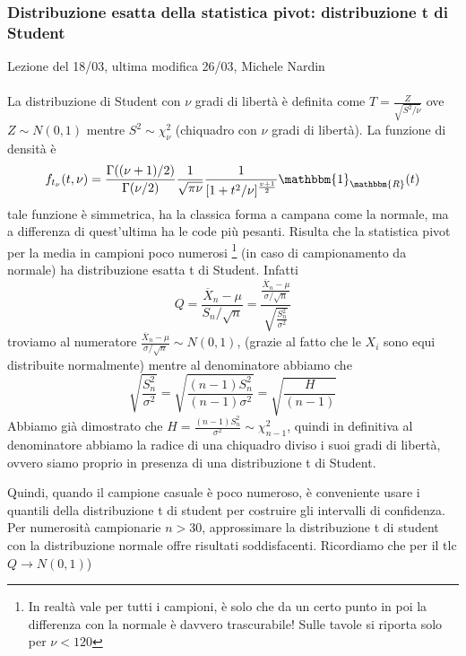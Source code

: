 
\subsubsection{Distribuzione esatta della statistica pivot: distribuzione t di Student}

Lezione del 18/03, ultima modifica 26/03, Michele Nardin
\\
\\
La distribuzione di Student con $\nu$ gradi di libertà è definita come 
$T=\frac{Z}{\sqrt{S^2 / \nu}}$ ove $Z \sim N(0,1)$ mentre $S^2 \sim \chi^2_\nu$ (chiquadro con $\nu$ gradi di libertà).
La funzione di densità è $$f_{t_\nu}(t,\nu)=\frac{\Gamma((\nu + 1)/2)}{\Gamma(\nu / 2)}
\frac{1}{\sqrt{\pi \nu}} \frac{1}{[1+t^2/\nu]^{\frac{v+1}{2}}} \mathbbm{1}_\mathbbm{R} (t)$$
tale funzione è simmetrica, ha la classica forma a campana come la normale, ma a differenza di quest'ultima ha le code più pesanti.
Risulta che la statistica pivot per la media in campioni poco numerosi 
\footnote{In realtà vale per tutti i campioni, è solo che da un certo punto in poi la differenza con la normale è davvero trascurabile! Sulle tavole si riporta solo per $\nu < 120$} (in caso di campionamento da normale) 
ha distribuzione esatta t di Student. Infatti 
$$Q=\frac{\overline{X}_n - \mu}{S_n / \sqrt{n}}=\frac{\frac{\overline{X}_n - \mu}{\sigma / \sqrt{n}}}{\sqrt{\frac{S^2_n}{\sigma^2}}}$$
troviamo al numeratore $\frac{\overline{X}_n - \mu}{\sigma / \sqrt{n}} \sim N(0,1)$, (grazie al fatto che le $X_i$ sono equi distribuite normalmente) 
mentre al denominatore abbiamo che 
$$\sqrt{\frac{S^2_n}{\sigma^2}}= \sqrt{\frac{(n-1)S^2_n}{(n-1) \sigma^2}}= \sqrt{\frac{H}{(n-1)}} $$
Abbiamo già dimostrato che $H=\frac{(n-1)S^2_n}{\sigma^2} \sim \chi^2_{n-1}$, quindi in definitiva al denominatore abbiamo la radice di una chiquadro diviso i suoi gradi di libertà, ovvero siamo proprio in presenza di una distribuzione t di Student.

Quindi, quando il campione casuale è poco numeroso, è conveniente usare i quantili della distribuzione t di student per costruire gli intervalli di confidenza. Per numerosità campionarie $n>30$, approssimare la distribuzione t di student con la distribuzione normale offre risultati soddisfacenti. Ricordiamo che per il tlc $Q\rightarrow N(0,1)$)


